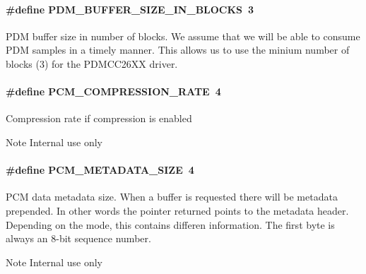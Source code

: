\paragraph[{P\+D\+M\+\_\+\+B\+U\+F\+F\+E\+R\+\_\+\+S\+I\+Z\+E\+\_\+\+I\+N\+\_\+\+B\+L\+O\+C\+K\+S}]{\setlength{\rightskip}{0pt plus 5cm}\#define P\+D\+M\+\_\+\+B\+U\+F\+F\+E\+R\+\_\+\+S\+I\+Z\+E\+\_\+\+I\+N\+\_\+\+B\+L\+O\+C\+K\+S~3}\label{_p_d_m_c_c26_x_x_8h_ac27121ab901a1442bbebbdac45fce296}
P\+D\+M buffer size in number of blocks. We assume that we will be able to consume P\+D\+M samples in a timely manner. This allows us to use the minium number of blocks (3) for the P\+D\+M\+C\+C26\+X\+X driver. 
\paragraph[{P\+C\+M\+\_\+\+C\+O\+M\+P\+R\+E\+S\+S\+I\+O\+N\+\_\+\+R\+A\+T\+E}]{\setlength{\rightskip}{0pt plus 5cm}\#define P\+C\+M\+\_\+\+C\+O\+M\+P\+R\+E\+S\+S\+I\+O\+N\+\_\+\+R\+A\+T\+E~4}\label{_p_d_m_c_c26_x_x_8h_a98722a106401368b0df3e68c19c7edd3}
Compression rate if compression is enabled \begin{DoxyNote}{Note}
Internal use only 
\end{DoxyNote}
\paragraph[{P\+C\+M\+\_\+\+M\+E\+T\+A\+D\+A\+T\+A\+\_\+\+S\+I\+Z\+E}]{\setlength{\rightskip}{0pt plus 5cm}\#define P\+C\+M\+\_\+\+M\+E\+T\+A\+D\+A\+T\+A\+\_\+\+S\+I\+Z\+E~4}\label{_p_d_m_c_c26_x_x_8h_ae553576c451c4277d4496b5fe7f26e24}
P\+C\+M data metadata size. When a buffer is requested there will be metadata prepended. In other words the pointer returned points to the metadata header. Depending on the mode, this contains differen information. The first byte is always an 8-\/bit sequence number. \begin{DoxyNote}{Note}
Internal use only 
\end{DoxyNote}
